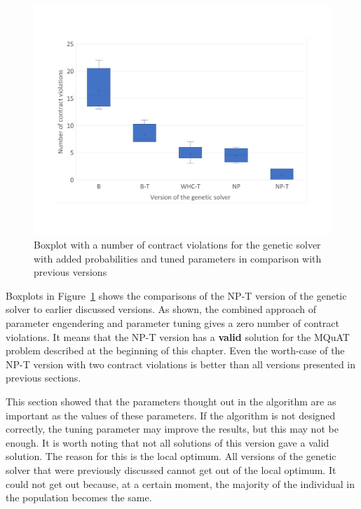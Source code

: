 \begin{figure}
	\centering
	\includegraphics[width=\textwidth]{images/BoxPlotSolverNewParametersTuning.pdf}
	\caption[Boxplot with a number of contract violations for the genetic solver with added probabilities and tuned parameters in comparison with previous versions]{Boxplot with a number of contract violations for the genetic solver with added probabilities and tuned parameters in comparison with previous versions}
	\label{fig:boxplotsolverNewParametersTuning}
\end{figure}

Boxplots in Figure~\ref{fig:boxplotsolverNewParametersTuning} shows the comparisons of the NP-T version of the genetic solver to earlier discussed versions. As shown, the combined approach of parameter engendering and parameter tuning gives a zero number of contract violations. It means that the NP-T version has a \textbf{valid} solution for the MQuAT problem described at the beginning of this chapter. Even the worth-case of the NP-T version with two contract violations is better than all versions presented in previous sections.  

This section showed that the parameters thought out in the algorithm are as important as the values of these parameters. If the algorithm is not designed correctly, the tuning parameter may improve the results, but this may not be enough. It is worth noting that not all solutions of this version gave a valid solution. The reason for this is the local optimum. All versions of the genetic solver that were previously discussed cannot get out of the local optimum.  It could not get out because, at a certain moment, the majority of the individual in the population becomes the same.

